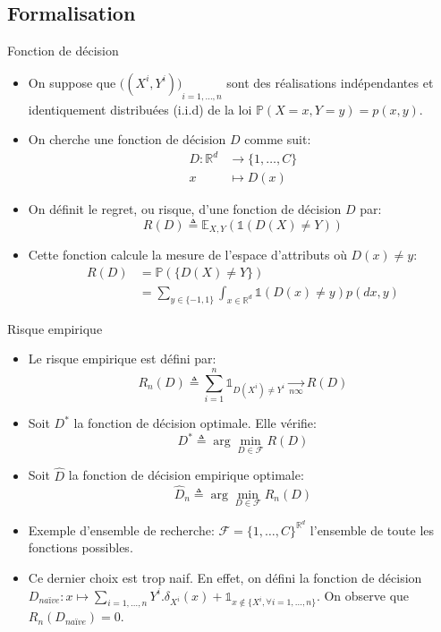 \documentclass[8pt]{beamer}
\begin{document}
		\subsection{Formalisation}
			\begin{frame}{Fonction de décision}
				\begin{itemize}
					\item<1-> On suppose que ${\big((X^i, Y^i)\big)}_{i=1,\dots,n}$ sont des réalisations indépendantes et identiquement distribuées (i.i.d) de la loi $\mathbb{P}(X=x, Y=y) = p(x,y)$.
					\item<2-> On cherche une fonction de décision $D$ comme suit:
					\begin{align*}
						D: \mathbb{R}^d &\rightarrow \{1, \dots, C\} \\
						x &\mapsto D(x)
					\end{align*}
					\item<3-> On définit le regret, ou risque, d'une fonction de décision $D$ par:
					\begin{equation}
						R(D) \triangleq \mathbb{E}_{X,Y}(\mathbb{1}(D(X)\neq Y))
					\end{equation}
					\item<4-> Cette fonction calcule la mesure de l'espace d'attributs où $D(x) \neq y$:
					\begin{align*}
						R(D) &= \mathbb{P}(\{D(X)\neq Y\})\\
							&= \sum_{y\in \{-1, 1\}} \int_{x \in \mathbb{R}^d} \mathbb{1}(D(x)\neq y) p(dx, y)
					\end{align*}
				\end{itemize}
			\end{frame}
			\begin{frame}{Risque empirique}
				\begin{itemize}
					\item<1-> Le risque empirique est défini par:
						\begin{equation}
							R_n(D) \triangleq \sum_{i=1}^n \mathbb{1}_{D(X^i) \neq Y^i} \underset{n\infty}{\longrightarrow} R(D)
						\end{equation}
					\item<2-> Soit \(D^*\) la fonction de décision optimale. Elle vérifie:
						\begin{equation}
							D^* \triangleq \arg\min_{D \in \mathscr{F}} R(D)
						\end{equation}
					\item<3-> Soit \(\widehat D \) la fonction de décision empirique optimale:
						\begin{equation}
							\widehat D_n \triangleq \arg\min_{D \in \mathscr{F}} R_n(D)
						\end{equation}
					\item<3-> Exemple d'ensemble de recherche: \(\mathscr{F} = \{1, \dots, C\}^{\mathbb{R}^d}\) l'ensemble de toute les fonctions possibles.
					\item<4-> Ce dernier choix est trop naif. En effet, on défini la fonction de décision \(D_{naïve}: x \mapsto \sum_{i=1,\dots,n} Y^i . \delta_{X^i}(x) + \mathbb{1}_{x \notin \{X^i, \forall i=1,\dots,n\}}\). On observe que \(R_n(D_{naïve}) = 0\).
				\end{itemize}
			\end{frame}
\end{document}
